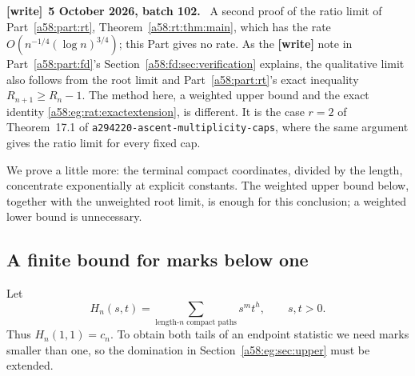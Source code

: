 \documentclass[11pt,letterpaper]{article}
\newcommand{\file}[1]{\nolinkurl{#1}}
\theoremstyle{remark}
\newenvironment{writenote}[1][]{\par\smallskip\begingroup\small
 \noindent\textbf{[write]}\if\relax\detokenize{#1}\relax\else~\textbf{#1.}\fi\ }%
 {\par\endgroup\smallskip}
\begin{document}
\begin{writenote}[5 October 2026, batch 102]
A second proof of the ratio limit of Part~\ref{a58:part:rt}, Theorem~\ref{a58:rt:thm:main}, which has the rate $O(n^{-1/4}(\log n)^{3/4})$; this Part gives no rate. As the \textbf{[write]} note in Part~\ref{a58:part:fd}'s Section~\ref{a58:fd:sec:verification} explains, the qualitative limit also follows from the root limit and Part~\ref{a58:part:rt}'s exact inequality $R_{n+1}\ge R_n-1$. The method here, a weighted upper bound and the exact identity \eqref{a58:eg:rat:exactextension}, is different. It is the case $r=2$ of Theorem~17.1 of \file{a294220-ascent-multiplicity-caps}, where the same argument gives the ratio limit for every fixed cap.
\end{writenote}
We prove a little more: the terminal compact coordinates, divided by the length, concentrate exponentially at explicit constants. The weighted upper bound below, together with the unweighted root limit, is enough for this conclusion; a weighted lower bound is unnecessary.

\subsection{A finite bound for marks below one}
Let
\[
 H_n(s,t)=\sum_{\text{length-}n\text{ compact paths}}s^m t^h,
 \qquad s,t>0.
\]
Thus $H_n(1,1)=c_n$. To obtain both tails of an endpoint statistic we need marks smaller than one, so the domination in Section~\ref{a58:eg:sec:upper} must be extended.
\end{document}
